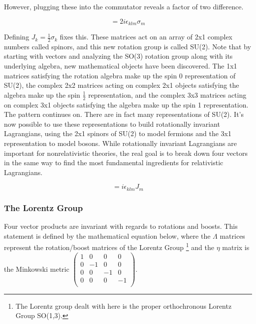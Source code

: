 However, plugging these into the commutator reveals a factor of two difference.

\begin{equation}
[\sigma_k, \sigma_l] = 2i\epsilon_{klm}\sigma_m
\end{equation}

Defining $J_k = \frac{1}{2} \sigma_k$ fixes this. These matrices act on an array of 2x1 complex numbers called spinors, and this new rotation group is called SU(2). Note that by starting with vectors and analyzing the SO(3) rotation group along with its underlying algebra, new mathematical objects have been discovered. The 1x1 matrices satisfying the rotation algebra make up the spin 0 representation of SU(2), the complex 2x2 matrices acting on complex 2x1 objects satisfying the algebra make up the spin $\frac{1}{2}$ representation, and the complex 3x3 matrices acting on complex 3x1 objects satisfying the algebra make up the spin 1 representation. The pattern continues on. There are in fact many representations of SU(2). It's now possible to use these representations to build rotationally invariant Lagrangians, using the 2x1 spinors of SU(2) to model fermions and the 3x1 representation to model bosons. While rotationally invariant Lagrangians are important for nonrelativistic theories, the real goal is to break down four vectors in the same way to find the most fundamental ingredients for relativistic Lagrangians. 

\begin{equation}
[J_k, J_l] = i\epsilon_{klm}J_m
\end{equation}

\subsubsection{The Lorentz Group}
Four vector products are invariant with regards to rotations and boosts. This statement is defined by the mathematical equation below, where the $\Lambda$ matrices represent the rotation/boost matrices of the Lorentz Group \footnote{The Lorentz group dealt with here is the proper orthochronous Lorentz Group SO(1,3).} and the $\eta$ matrix is the Minkowski metric $\left( \begin{smallmatrix} 1 & 0 & 0 & 0 \\ 0 & -1 & 0 & 0 \\ 0 & 0 & -1 & 0 \\ 0 & 0 & 0 & -1 \\ \end{smallmatrix} \right)$.

